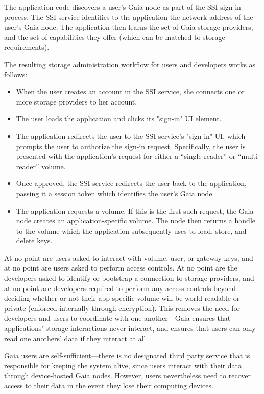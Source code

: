 
The application code discovers a user's Gaia node as part of the SSI sign-in
process.  The SSI service identifies to the application the network address
of the user's Gaia node.  The application then learns the set of Gaia storage
providers, and the set of capabilities they offer (which can be matched to
storage requirements).

The resulting storage administration workflow for users and developers works as
follows:
\begin{itemize}
   \item When the user creates an account in the SSI service, she connects one
      or more storage providers to her account.
   \item The user loads the application and clicks its "sign-in" UI element.
   \item The application redirects the user to the SSI service's "sign-in" UI,
      which prompts the user to authorize the sign-in request.  Specifically,
      the user is presented with the application's request for either a
      ``single-reader'' or ``multi-reader'' volume.
   \item Once approved, the SSI service redirects the user back to the
      application, passing it a session token which identifies the user's Gaia
      node.
   \item The application requests a volume.  If this is the first such request,
      the Gaia node creates an application-specific volume.  The node then
      returns a handle to the volume which the application subsequently uses to
      load, store, and delete keys.
\end{itemize}

At no point are users asked to interact with volume, user, or gateway keys, and at no point
are users asked to perform access controls.  At no point are the developers
asked to identify or bootstrap a connection to storage providers, and at no
point are developers required to perform any access controls beyond deciding
whether or not their app-specific volume will be world-readable or private
(enforced internally through encryption).  This removes the need for developers
and users to coordinate with one another---Gaia ensures that applications' storage
interactions never interact, and ensures that users can only read one anothers'
data if they interact at all.

Gaia users are self-sufficient---there is no designated third party service that is
responsible for keeping the system alive, since users interact with their data
through device-hosted Gaia nodes.  However, users nevertheless need to recover
access to their data in the event they lose their computing devices.

